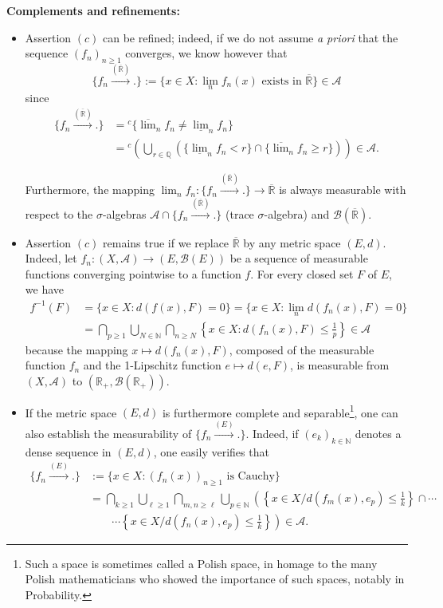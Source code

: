 \documentclass[12pt]{article}
\theoremstyle{definition}
\begin{document}
\textbf{Complements and refinements:}
\begin{itemize}
    \item[\textbf{1.}] Assertion $(c)$ can be refined; indeed, if we do not assume \textit{a priori} that the sequence $(f_n)_{n \geq 1}$ converges, we know however that
$$ \{f_n \xrightarrow{(\overline{\mathbb{R}})} .\} := \{x \in X : \lim_n f_n(x) \text{ exists in } \overline{\mathbb{R}}\} \in \mathscr{A} $$
since
\begin{align*}
\{f_n \xrightarrow{(\overline{\mathbb{R}})} .\} &= {}^c\{\overline{\lim}_n f_n \neq \underline{\lim}_n f_n\} \\
&= {}^c \left( \bigcup_{r \in \mathbb{Q}} \left( \{\underline{\lim}_n f_n < r\} \cap \{\overline{\lim}_n f_n \geq r\} \right) \right) \in \mathscr{A}.
\end{align*}

Furthermore, the mapping $\lim_n f_n : \{f_n \xrightarrow{(\overline{\mathbb{R}})} .\} \to \overline{\mathbb{R}}$ is always measurable with respect to the $\sigma$-algebras $\mathscr{A} \cap \{f_n \xrightarrow{(\overline{\mathbb{R}})} .\}$ (trace $\sigma$-algebra) and $\mathscr{B}(\overline{\mathbb{R}})$.

    \item[\textbf{2.}] Assertion $(c)$ remains true if we replace $\overline{\mathbb{R}}$ by any metric space $(E,d)$. Indeed, let $f_n : (X, \mathscr{A}) \to (E, \mathscr{B}(E))$ be a sequence of measurable functions converging pointwise to a function $f$. For every closed set $F$ of $E$, we have
\begin{align*}
f^{-1}(F) &= \{x \in X : d(f(x), F) = 0\} = \{x \in X : \lim_n d(f_n(x), F) = 0\} \\
&= \bigcap_{p \geq 1} \bigcup_{N \in \mathbb{N}} \bigcap_{n \geq N} \left\{ x \in X : d(f_n(x), F) \leq \frac{1}{p} \right\} \in \mathscr{A}
\end{align*}
because the mapping $x \mapsto d(f_n(x), F)$, composed of the measurable function $f_n$ and the 1-Lipschitz function $e \mapsto d(e, F)$, is measurable from $(X, \mathscr{A})$ to $(\mathbb{R}_+, \mathscr{B}(\mathbb{R}_+))$.

    \item[\textbf{3.}] If the metric space $(E,d)$ is furthermore complete and separable\footnote{Such a space is sometimes called a Polish space, in homage to the many Polish mathematicians who showed the importance of such spaces, notably in Probability.}, one can also establish the measurability of $\{f_n \xrightarrow{(E)} .\}$. Indeed, if $(e_k)_{k \in \mathbb{N}}$ denotes a dense sequence in $(E,d)$, one easily verifies that
\begin{align*}
\{f_n \xrightarrow{(E)} .\} &:= \{x \in X : (f_n(x))_{n \geq 1} \text{ is Cauchy} \} \\
&= \bigcap_{k \geq 1} \bigcup_{\ell \geq 1} \bigcap_{m, n \geq \ell} \bigcup_{p \in \mathbb{N}} \left( \left\{ x \in X / d(f_m(x), e_p) \leq \frac{1}{k} \right\} \cap \cdots \right. \\
&\qquad \left. \cdots \left\{ x \in X / d(f_n(x), e_p) \leq \frac{1}{k} \right\} \right) \in \mathscr{A}.
\end{align*}


\end{itemize}
\end{document}
